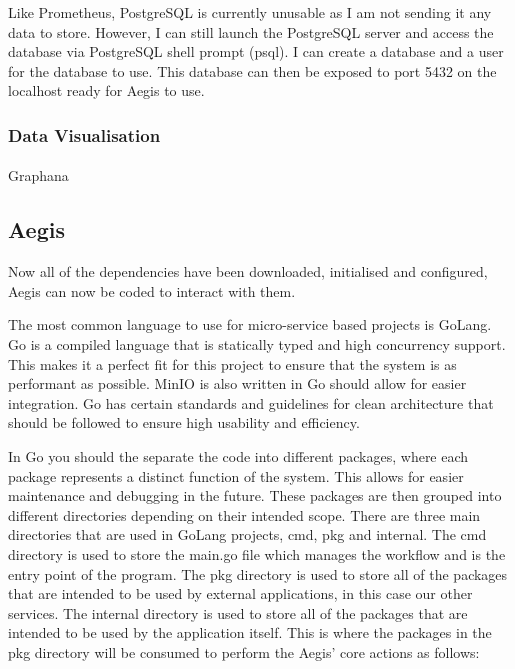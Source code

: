 \documentclass[12pt, conference, final, a4paper, onecolumn, compsoc]{IEEEtran}
\begin{document}

Like Prometheus, PostgreSQL is currently unusable as I am not sending it any
data to store. However, I can still launch the PostgreSQL server and access the
database via PostgreSQL shell prompt (psql). I can create a database and a user
for the database to use. This database can then be exposed to port 5432 on the
localhost ready for Aegis to use.


\subsubsection*{Data Visualisation}
\paragraph{}

Graphana





\subsection*{Aegis}

Now all of the dependencies have been downloaded, initialised and configured,
Aegis can now be coded to interact with them.


The most common language to use for micro-service based projects is GoLang. Go
is a compiled language that is statically typed and high concurrency support.
This makes it a perfect fit for this project to ensure that the system is as
performant as possible. MinIO is also written in Go should allow for easier
integration. Go has certain standards and guidelines for clean architecture that
should be followed to ensure high usability and efficiency.

In Go you should the separate the code into different packages, where each
package represents a distinct function of the system. This allows for easier
maintenance and debugging in the future. These packages are then grouped into
different directories depending on their intended scope. There are three main
directories that are used in GoLang projects, cmd, pkg and internal. The cmd
directory is used to store the main.go file which manages the workflow and is
the entry point of the program. The pkg directory is used to store all of the
packages that are intended to be used by external applications, in this case our
other services. The internal directory is used to store all of the packages that
are intended to be used by the application itself. This is where the packages in
the pkg directory will be consumed to perform the Aegis' core actions as follows:
\end{document}
